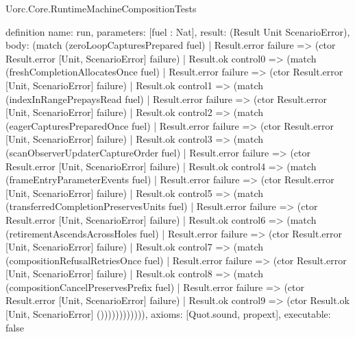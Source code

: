 \begin{lexlean}{Uorc.Core.RuntimeMachineCompositionTests}
\begin{semanticmodule}
definition{
  name: run,
  parameters: [fuel : Nat],
  result: (Result Unit ScenarioError),
  body: (match (zeroLoopCapturesPrepared fuel)
    | Result.error failure => (ctor Result.error [Unit, ScenarioError] failure)
    | Result.ok control0 => (match (freshCompletionAllocatesOnce fuel)
      | Result.error failure => (ctor Result.error [Unit, ScenarioError] failure)
      | Result.ok control1 => (match (indexInRangePrepaysRead fuel)
        | Result.error failure => (ctor Result.error [Unit, ScenarioError] failure)
        | Result.ok control2 => (match (eagerCapturesPreparedOnce fuel)
          | Result.error failure => (ctor Result.error [Unit, ScenarioError] failure)
          | Result.ok control3 => (match (scanObserverUpdaterCaptureOrder fuel)
            | Result.error failure => (ctor Result.error [Unit, ScenarioError] failure)
            | Result.ok control4 => (match (frameEntryParameterEvents fuel)
              | Result.error failure => (ctor Result.error [Unit, ScenarioError] failure)
              | Result.ok control5 => (match (transferredCompletionPreservesUnits fuel)
                | Result.error failure => (ctor Result.error [Unit, ScenarioError] failure)
                | Result.ok control6 => (match (retirementAscendsAcrossHoles fuel)
                  | Result.error failure => (ctor Result.error [Unit, ScenarioError] failure)
                  | Result.ok control7 => (match (compositionRefusalRetriesOnce fuel)
                    | Result.error failure => (ctor Result.error [Unit, ScenarioError] failure)
                    | Result.ok control8 => (match (compositionCancelPreservesPrefix fuel)
                      | Result.error failure => (ctor Result.error [Unit, ScenarioError] failure)
                      | Result.ok control9 => (ctor Result.ok [Unit, ScenarioError] ()))))))))))),
  axioms: [Quot.sound, propext],
  executable: false
}
\end{semanticmodule}
\end{lexlean}
